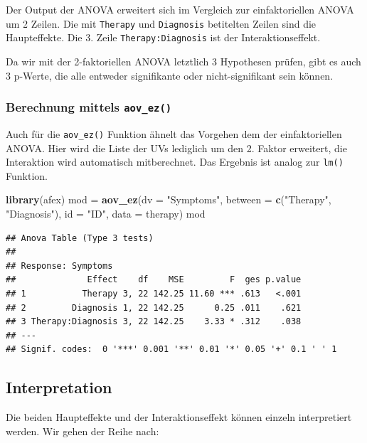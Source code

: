 \documentclass[
]{book}
\newenvironment{Shaded}{\begin{snugshade}}{\end{snugshade}}
\newcommand{\AttributeTok}[1]{\textcolor[rgb]{0.13,0.29,0.53}{#1}}
\newcommand{\FunctionTok}[1]{\textcolor[rgb]{0.13,0.29,0.53}{\textbf{#1}}}
\newcommand{\NormalTok}[1]{#1}
\newcommand{\OtherTok}[1]{\textcolor[rgb]{0.56,0.35,0.01}{#1}}
\newcommand{\StringTok}[1]{\textcolor[rgb]{0.31,0.60,0.02}{#1}}
\begin{document}
Der Output der ANOVA erweitert sich im Vergleich zur einfaktoriellen ANOVA um 2 Zeilen. Die mit \texttt{Therapy} und \texttt{Diagnosis} betitelten Zeilen sind die Haupteffekte. Die 3. Zeile \texttt{Therapy:Diagnosis} ist der Interaktionseffekt.

Da wir mit der 2-faktoriellen ANOVA letztlich 3 Hypothesen prüfen, gibt es auch 3 p-Werte, die alle entweder signifikante oder nicht-signifikant sein können.

\subsubsection{\texorpdfstring{Berechnung mittels \texttt{aov\_ez()}}{Berechnung mittels aov\_ez()}}\label{berechnung-mittels-aov_ez-1}

Auch für die \texttt{aov\_ez()} Funktion ähnelt das Vorgehen dem der einfaktoriellen ANOVA. Hier wird die Liste der UVs lediglich um den 2. Faktor erweitert, die Interaktion wird automatisch mitberechnet. Das Ergebnis ist analog zur \texttt{lm()} Funktion.

\begin{Shaded}
\begin{Highlighting}[]
\FunctionTok{library}\NormalTok{(afex)}
\NormalTok{mod }\OtherTok{=} \FunctionTok{aov\_ez}\NormalTok{(}\AttributeTok{dv =} \StringTok{"Symptoms"}\NormalTok{, }\AttributeTok{between =} \FunctionTok{c}\NormalTok{(}\StringTok{"Therapy"}\NormalTok{, }\StringTok{"Diagnosis"}\NormalTok{), }\AttributeTok{id =} \StringTok{"ID"}\NormalTok{, }\AttributeTok{data =}\NormalTok{ therapy)}
\NormalTok{mod}
\end{Highlighting}
\end{Shaded}

\begin{verbatim}
## Anova Table (Type 3 tests)
## 
## Response: Symptoms
##              Effect    df    MSE         F  ges p.value
## 1           Therapy 3, 22 142.25 11.60 *** .613   <.001
## 2         Diagnosis 1, 22 142.25      0.25 .011    .621
## 3 Therapy:Diagnosis 3, 22 142.25    3.33 * .312    .038
## ---
## Signif. codes:  0 '***' 0.001 '**' 0.01 '*' 0.05 '+' 0.1 ' ' 1
\end{verbatim}

\subsection{Interpretation}\label{interpretation-1}

Die beiden Haupteffekte und der Interaktionseffekt können einzeln interpretiert werden. Wir gehen der Reihe nach:
\end{document}
